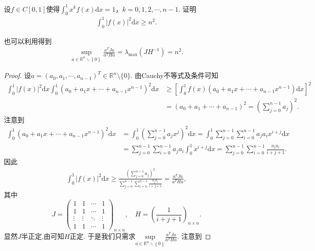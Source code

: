 \documentclass[../../main.tex]{subfiles}%
\begin{document}
\begin{proposition}\label{proposition:Hilbert矩阵性质的应用1}
设$f\in C[0,1]$使得$\int_{0}^{1}x^{k}f(x)\mathrm{d}x = 1$，$k = 0,1,2,\cdots,n - 1$. 证明
\begin{align*}
\int_{0}^{1}|f(x)|^{2}\mathrm{d}x\geqslant n^{2}.
\end{align*}
\end{proposition}
\begin{note}
也可以利用得到\begin{align*}
\mathop {\mathrm{sup}} \limits_{a\in \mathbb{R} ^n\backslash \left\{ 0 \right\}}\frac{a^TJa}{a^THa}=\lambda _{\max}\left( JH^{-1} \right) =n^2.
\end{align*}
\end{note}
\begin{proof}
设$a=(a_0,a_1,\cdots,a_{n-1})^T\in\mathbb{R}^n\setminus\{0\}$. 由Cauchy不等式及条件可知
\begin{align*}
\int_0^1 |f(x)|^2\mathrm{d}x \int_0^1 (a_0 + a_1x + \cdots + a_{n-1}x^{n-1})^2\mathrm{d}x &\geqslant \left[ \int_0^1 f(x)(a_0 + a_1x + \cdots + a_{n-1}x^{n-1})\mathrm{d}x \right]^2 \\
&= (a_0 + a_1 + \cdots + a_{n-1})^2 = \left( \sum_{j=0}^{n-1}a_j \right)^2.
\end{align*}
注意到
\begin{align*}
\int_0^1 (a_0 + a_1x + \cdots + a_{n-1}x^{n-1})^2\mathrm{d}x &= \int_0^1 \left( \sum_{j=0}^{n-1}a_jx^j \right)^2\mathrm{d}x = \int_0^1 \sum_{j=0}^{n-1}\sum_{i=0}^{n-1}a_ja_ix^{i+j}\mathrm{d}x \\
&= \sum_{j=0}^{n-1}\sum_{i=0}^{n-1}a_ja_i \int_0^1 x^{i+j}\mathrm{d}x = \sum_{j=0}^{n-1}\sum_{i=0}^{n-1}\frac{a_ja_i}{i+j+1}.
\end{align*}
因此
\begin{align*}
\int_0^1 |f(x)|^2\mathrm{d}x \geqslant \frac{\left( \sum\limits_{j=0}^{n-1}a_j \right)^2}{\sum\limits_{j=0}^{n-1}\sum\limits_{i=0}^{n-1}\frac{a_ja_i}{i+j+1}} = \frac{a^TJa}{a^THa},
\end{align*}
其中
$$
J=\begin{pmatrix}1 & 1 & \cdots & 1 \\ 1 & 1 & \cdots & 1 \\ \vdots & \vdots & \ddots & \vdots \\ 1 & 1 & \cdots & 1\end{pmatrix}_{n\times n},\quad H=\left( \frac{1}{i+j+1} \right)_{n\times n}.
$$
显然$J$半正定,由可知$H$正定. 于是我们只需求$\underset{a\in \mathbb{R} ^n\backslash \left\{ 0 \right\}}{\mathrm{sup}}\frac{a^TJa}{a^THa}$. 注意到

\end{proof}
\end{document}

